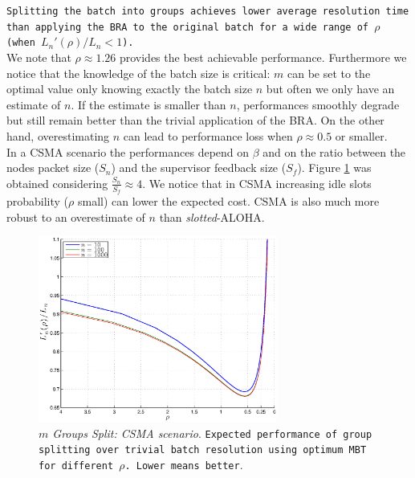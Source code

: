 \documentclass[11pt,a4paper,twoside,openright]{book}
\newcommand{\revv}[1]{{\tt#1}}
\begin{document}
\revv{Splitting the batch into groups achieves lower average resolution time than applying the BRA to the original batch for a wide range of $\rho$ \mbox{(when $L_{n}'(\rho)/L_{n}<1$)}.}\\
We note that  $\rho\approx 1.26$ provides the best achievable performance. Furthermore we notice that the knowledge of the batch size is critical: $m$ can be set to the optimal value only knowing exactly the batch size $n$ but often we only have an estimate of $n$. If the estimate is smaller than $n$, performances smoothly degrade but still remain better than the trivial application of the BRA. On the other hand, overestimating $n$ can lead to performance loss when $\rho \approx 0.5$ or smaller.\\

In a CSMA scenario the performances depend on $\beta$ and on the ratio between the nodes packet size ($S_{n}$) and the supervisor feedback size ($S_{f}$). Figure \ref{m-groups-MBT-CSMA} was obtained considering $\displaystyle\frac{S_{n}}{S_{f}}\approx4$. We notice that in CSMA increasing idle slots probability ($\rho$ small) can lower the expected cost. CSMA is also much more robust to an overestimate of $n$ than \emph{slotted}-ALOHA.

\begin{figure}[H]
\begin{center}
\includegraphics[width=0.7\textwidth]{matlab/BTs/m-groups-MBT-CSMA}
\caption[$m$ Groups Split: CSMA scenario]{\emph{$m$ Groups Split: CSMA scenario}.  \revv{Expected performance of group splitting over trivial batch resolution using optimum MBT for different $\rho$. Lower means better}.}
\label{m-groups-MBT-CSMA}
\end{center}
\end{figure}
\end{document}
